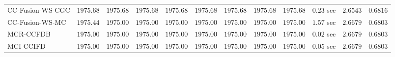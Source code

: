 \begin{table}[H]
\begin{tabular}{lrrrrrrrrrrr}
    CC-Fusion-WS-CGC & $      1975.68$ & $      1975.68$ & $      1975.68$ & $      1975.68$ & $      1975.68$ & $      1975.68$ & $      1975.68$ & $      1975.68$ & $         0.23$ sec    & $       2.6543$  & $       0.6816$ \\ 
     CC-Fusion-WS-MC & $      1975.44$ & $      1975.00$ & $      1975.00$ & $      1975.00$ & $      1975.00$ & $      1975.00$ & $      1975.00$ & $      1975.00$ & $         1.57$ sec    & $       2.6679$  & $       0.6803$ \\ 
\cmidrule{1-1} 
           MCR-CCFDB & $      1975.00$ & $      1975.00$ & $      1975.00$ & $      1975.00$ & $      1975.00$ & $      1975.00$ & $      1975.00$ & $      1975.00$ & $         0.02$ sec    & $       2.6679$  & $       0.6803$ \\ 
\cmidrule{1-1} 
           MCI-CCIFD & $      1975.00$ & $      1975.00$ & $      1975.00$ & $      1975.00$ & $      1975.00$ & $      1975.00$ & $      1975.00$ & $      1975.00$ & $         0.05$ sec    & $       2.6679$  & $       0.6803$ \\ 
\bottomrule
\end{tabular}
\end{table}

